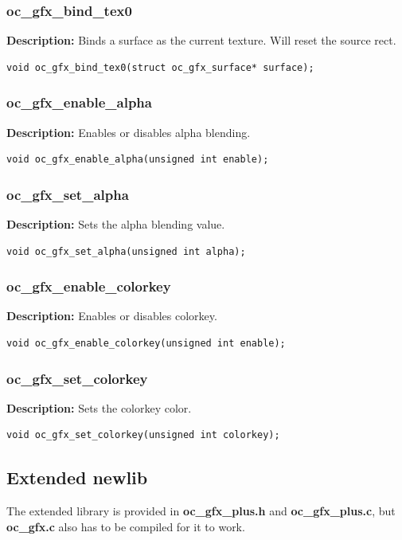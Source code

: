 \documentclass[10pt,a4paper]{article}
\begin{document}
\subsubsection{oc\_gfx\_bind\_tex0}
\textbf{Description:} Binds a surface as the current texture. Will reset the source rect.
\begin{lstlisting}
void oc_gfx_bind_tex0(struct oc_gfx_surface* surface);
\end{lstlisting}


\subsubsection{oc\_gfx\_enable\_alpha}
\textbf{Description:} Enables or disables alpha blending.
\begin{lstlisting}
void oc_gfx_enable_alpha(unsigned int enable);
\end{lstlisting}

\subsubsection{oc\_gfx\_set\_alpha}
\textbf{Description:} Sets the alpha blending value.
\begin{lstlisting}
void oc_gfx_set_alpha(unsigned int alpha);
\end{lstlisting}

\subsubsection{oc\_gfx\_enable\_colorkey}
\textbf{Description:} Enables or disables colorkey.
\begin{lstlisting}
void oc_gfx_enable_colorkey(unsigned int enable);
\end{lstlisting}

\subsubsection{oc\_gfx\_set\_colorkey}
\textbf{Description:} Sets the colorkey color.
\begin{lstlisting}
void oc_gfx_set_colorkey(unsigned int colorkey);
\end{lstlisting}

\subsection{Extended newlib}
The extended library is provided in \textbf{oc\_gfx\_plus.h} and \textbf{oc\_gfx\_plus.c}, but \textbf{oc\_gfx.c} also has to be compiled for it to work.
\end{document}
